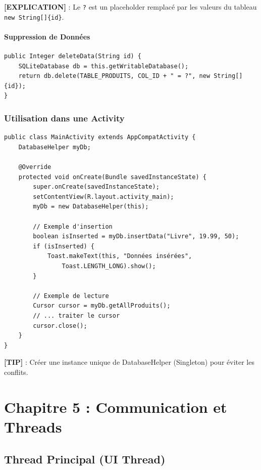 \documentclass[11pt,a4paper]{article}
\begin{document}
\textbf{[EXPLICATION]} : Le \texttt{?} est un placeholder remplacé par les valeurs du tableau \texttt{new String[]\{id\}}.

\paragraph{Suppression de Données}

\begin{lstlisting}
public Integer deleteData(String id) {
    SQLiteDatabase db = this.getWritableDatabase();
    return db.delete(TABLE_PRODUITS, COL_ID + " = ?", new String[]{id});
}
\end{lstlisting}

\subsubsection{Utilisation dans une Activity}

\begin{lstlisting}
public class MainActivity extends AppCompatActivity {
    DatabaseHelper myDb;
    
    @Override
    protected void onCreate(Bundle savedInstanceState) {
        super.onCreate(savedInstanceState);
        setContentView(R.layout.activity_main);
        myDb = new DatabaseHelper(this);
        
        // Exemple d'insertion
        boolean isInserted = myDb.insertData("Livre", 19.99, 50);
        if (isInserted) {
            Toast.makeText(this, "Données insérées", 
                Toast.LENGTH_LONG).show();
        }
        
        // Exemple de lecture
        Cursor cursor = myDb.getAllProduits();
        // ... traiter le cursor
        cursor.close();
    }
}
\end{lstlisting}

\textbf{[TIP]} : Créer une instance unique de DatabaseHelper (Singleton) pour éviter les conflits.


\section{Chapitre 5 : Communication et Threads}

\subsection{Thread Principal (UI Thread)}
\end{document}
